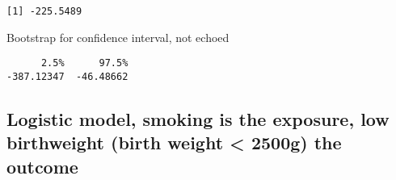 \documentclass[
  letterpaper,
  DIV=11,
  numbers=noendperiod]{scrartcl}
\newenvironment{Shaded}{\begin{snugshade}}{\end{snugshade}}
\newcommand{\AttributeTok}[1]{\textcolor[rgb]{0.40,0.45,0.13}{#1}}
\newcommand{\DecValTok}[1]{\textcolor[rgb]{0.68,0.00,0.00}{#1}}
\newcommand{\FunctionTok}[1]{\textcolor[rgb]{0.28,0.35,0.67}{#1}}
\newcommand{\NormalTok}[1]{\textcolor[rgb]{0.00,0.23,0.31}{#1}}
\newcommand{\OtherTok}[1]{\textcolor[rgb]{0.00,0.23,0.31}{#1}}
\newcommand{\SpecialCharTok}[1]{\textcolor[rgb]{0.37,0.37,0.37}{#1}}
\newcommand{\StringTok}[1]{\textcolor[rgb]{0.13,0.47,0.30}{#1}}
\begin{document}
\begin{Shaded}
\end{Shaded}

\begin{verbatim}
[1] -225.5489
\end{verbatim}

Bootstrap for confidence interval, not echoed

\begin{verbatim}
      2.5%      97.5% 
-387.12347  -46.48662 
\end{verbatim}

\hypertarget{logistic-model-smoking-is-the-exposure-low-birthweight-birth-weight-2500g-the-outcome}{%
\subsection{Logistic model, smoking is the exposure, low birthweight
(birth weight \textless{} 2500g) the
outcome}\label{logistic-model-smoking-is-the-exposure-low-birthweight-birth-weight-2500g-the-outcome}}
\end{document}
